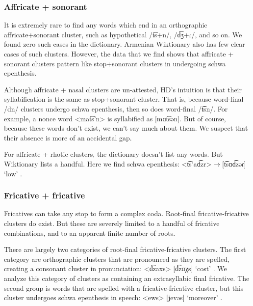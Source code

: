 	\subsubsection{Affricate + sonorant }\label{section:syllable:Final2C:FlatRising:AffrSono}
	It is extremely rare to find any words which end in an orthographic affricate+sonorant cluster, such as hypothetical /t͡s+n/, /d͡ʒ+ɾ/, and so on. We found zero such cases in the \citeauthor{kouyoumdjian-1970-DictionaryArmenianEnglish} dictionary. Armenian Wiktionary also has few clear cases of such clusters. However, the data that we find shows that affricate + sonorant clusters pattern like stop+sonorant clusters in undergoing schwa epenthesis.  
	
	
	Although affricate + nasal clusters are un-attested,  HD's intuition is that their syllabification is the same as stop+sonorant cluster. That is, because word-final /dn/ clusters undergo schwa epenthesis, then so does word-final /t͡sn/. For example, a nonce word  <mat͡s'n> is syllabified as [mɑt͡sən]. But of course, because these words don't exist, we can't say much about them. We suspect that their absence is more of an accidental gap. 
	
	For affricate + rhotic clusters, the \citeauthor{kouyoumdjian-1970-DictionaryArmenianEnglish} dictionary doesn't list any words. But Wiktionary lists a handful. Here we find schwa epenthesis: <t͡s'ad͡zr>$\rightarrow$[t͡sɑd͡zəɾ] `low' . 
	
	
	\subsubsection{Fricative + fricative }\label{section:syllable:Final2C:FlatRising:FricFric}
	Fricatives can take any stop to form a complex coda. Root-final fricative-fricative clusters do exist. But these are severely limited to a handful of fricative combinations, and to an apparent finite number of roots. 
	
	There are largely two categories of root-final fricative-fricative clusters. The first category are orthographic clusters that are pronounced as they are spelled, creating a consonant cluster in pronunciation: <d͡zaxs> [d͡zɑχs] `cost' . We analyze this category of clusters as containing an extrasyllabic final fricative. The second group is words that are spelled with a fricative-fricative cluster, but this cluster undergoes schwa epenthesis in speech: <ews>  [jevəs] `moreover' .
	
